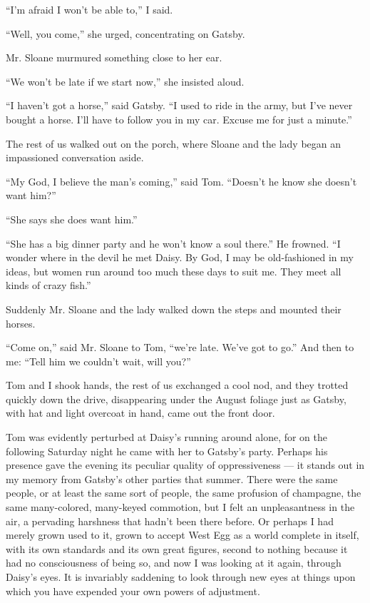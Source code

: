\documentclass{znotebook}
\begin{document}
``I’m afraid I won’t be able to,'' I said.

``Well, you come,'' she urged, concentrating on Gatsby.

Mr. Sloane murmured something close to her ear.

``We won’t be late if we start now,'' she insisted aloud.

``I haven’t got a horse,'' said Gatsby. ``I used to ride in the army, but I’ve never bought a horse. I’ll have to follow you in my car. Excuse me for just a minute.''

The rest of us walked out on the porch, where Sloane and the lady began an impassioned conversation aside.

``My God, I believe the man’s coming,'' said Tom. ``Doesn’t he know she doesn’t want him?''

``She says she does want him.''

``She has a big dinner party and he won’t know a soul there.'' He frowned. ``I wonder where in the devil he met Daisy. By God, I may be old-fashioned in my ideas, but women run around too much these days to suit me. They meet all kinds of crazy fish.''

Suddenly Mr. Sloane and the lady walked down the steps and mounted their horses.

``Come on,'' said Mr. Sloane to Tom, ``we’re late. We’ve got to go.'' And then to me: ``Tell him we couldn’t wait, will you?''

Tom and I shook hands, the rest of us exchanged a cool nod, and they trotted quickly down the drive, disappearing under the August foliage just as Gatsby, with hat and light overcoat in hand, came out the front door.

Tom was evidently perturbed at Daisy’s running around alone, for on the following Saturday night he came with her to Gatsby’s party. Perhaps his presence gave the evening its peculiar quality of oppressiveness — it stands out in my memory from Gatsby’s other parties that summer. There were the same people, or at least the same sort of people, the same profusion of champagne, the same many-colored, many-keyed commotion, but I felt an unpleasantness in the air, a pervading harshness that hadn’t been there before. Or perhaps I had merely grown used to it, grown to accept West Egg as a world complete in itself, with its own standards and its own great figures, second to nothing because it had no consciousness of being so, and now I was looking at it again, through Daisy’s eyes. It is invariably saddening to look through new eyes at things upon which you have expended your own powers of adjustment.
\end{document}
